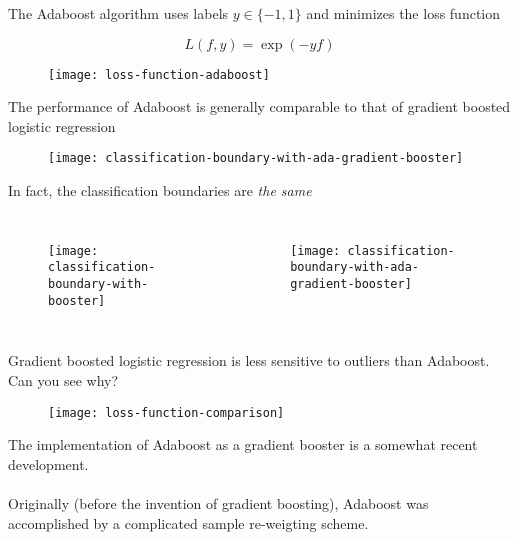 %
\begin{frame}
The Adaboost algorithm uses labels $y \in \{-1, 1\}$ and minimizes the loss function

$$ L(f, y) = \exp( - y f) $$

  \begin{figure}
    \texttt{[image: loss-function-adaboost]}
  \end{figure}

\end{frame}
%
\begin{frame}
The performance of Adaboost is generally comparable to that of gradient boosted logistic regression

  \begin{figure}
  
    \texttt{[image: classification-boundary-with-ada-gradient-booster]}
  \end{figure}
  
\end{frame}
%
\begin{frame}
In fact, the classification boundaries are \textit{the same}

  \begin{columns}
    \begin{figure}
      \texttt{[image: classification-boundary-with-booster]}
    \end{figure}
    \begin{figure}
      \texttt{[image: classification-boundary-with-ada-gradient-booster]}
    \end{figure}
  \end{columns}
  
\end{frame}
%
\begin{frame}
Gradient boosted logistic regression is less sensitive to outliers than Adaboost.  Can you see why?

  \begin{figure}
    \texttt{[image: loss-function-comparison]}
  \end{figure}
  
\end{frame}
%
\begin{frame}[fragile]
The implementation of Adaboost as a gradient booster is a somewhat recent development.\\~\\

Originally (before the invention of gradient boosting), Adaboost was accomplished by a complicated sample re-weigting scheme.\\~\\
\end{frame}
